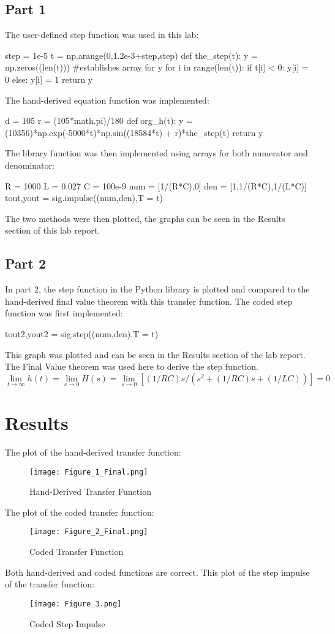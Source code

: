 \documentclass[12pt]{article}
\begin{document}
\subsection{Part 1}
The user-defined step function was used in this lab:
\begin{python}
step = 1e-5
t = np.arange(0,1.2e-3+step,step)
def the_step(t):
    y = np.zeros((len(t))) #establishes array for y
    for i in range(len(t)):
        if t[i] < 0:
             y[i] = 0 
        else:
             y[i] = 1
    return y
\end{python}  
The hand-derived equation function was implemented:
\begin{python}
d = 105
r = (105*math.pi)/180
def org_h(t):
    y = (10356)*np.exp(-5000*t)*np.sin((18584*t) + r)*the_step(t)
    return y
\end{python}
The library function was then implemented using arrays for both numerator and denominator:
\begin{python}
R = 1000
L = 0.027
C = 100e-9
num = [1/(R*C),0]
den = [1,1/(R*C),1/(L*C)]
tout,yout = sig.impulse((num,den),T = t)
\end{python}
The two methods were then plotted, the graphs can be seen in the Results section of this lab report.
  \subsection{Part 2}
In part 2, the step function in the Python library is plotted and compared to the hand-derived final value theorem with this transfer function.
The coded step function was first implemented:
\begin{python}
tout2,yout2 = sig.step((num,den),T = t)
\end{python}
This graph was plotted and can be seen in the Results section of the lab report.
The Final Value theorem was used here to derive the step function.
\[\lim_{t\to\infty} h(t) = \lim_{s\to0} H(s) = \lim_{s\to0} [(1/RC)s/(s^2 + (1/RC)s + (1/LC))] = 0\]
\clearpage
\section{Results}
The plot of the hand-derived transfer function:
\begin{figure}[H]
\texttt{[image: Figure\_1\_Final.png]}
  \caption{Hand-Derived Transfer Function}
  \end{figure}
The plot of the coded transfer function:
\begin{figure}[H]
\texttt{[image: Figure\_2\_Final.png]}
  \caption{Coded Transfer Function}
  \end{figure}
Both hand-derived and coded functions are correct.
This plot of the step impulse of the transfer function:  
  \begin{figure}[H]
\texttt{[image: Figure\_3.png]}
  \caption{Coded Step Impulse}
  \end{figure}
\end{document}
